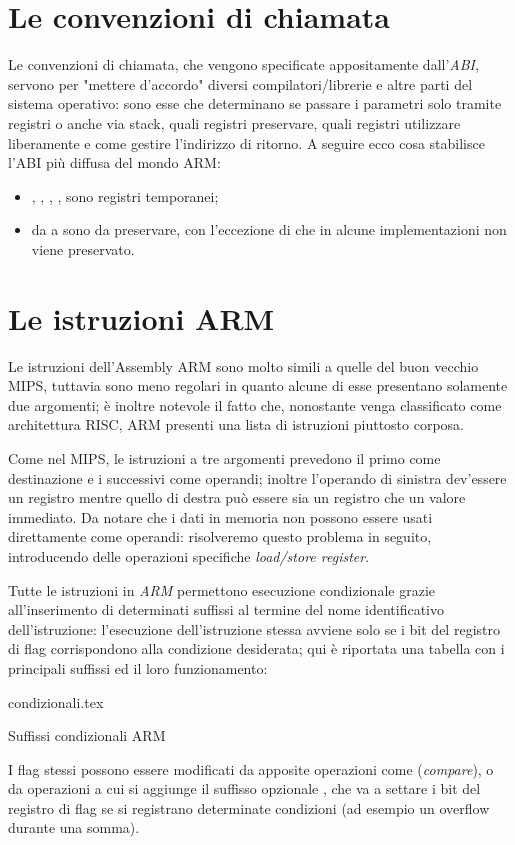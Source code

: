 \documentclass[class=book, crop=false, oneside]{standalone}
\begin{document}
\section{Le convenzioni di chiamata}
Le convenzioni di chiamata, che vengono specificate appositamente dall'\emph{ABI}, servono per "mettere d'accordo" diversi compilatori/librerie e altre parti del sistema operativo: sono esse che determinano se passare i parametri solo tramite registri o anche via stack, quali registri preservare, quali registri utilizzare liberamente e come gestire l'indirizzo di ritorno. A seguire ecco cosa stabilisce l'ABI più diffusa del mondo ARM:
\begin{itemize}
	\item {}, , , ,  sono registri temporanei;
	\item da  a  sono da preservare, con l'eccezione di  che in alcune implementazioni non viene preservato.
\end{itemize}

\section{Le istruzioni ARM}
Le istruzioni dell'Assembly ARM sono molto simili a quelle del buon vecchio MIPS, tuttavia sono meno regolari in quanto alcune di esse presentano solamente due argomenti; è inoltre notevole il fatto che, nonostante venga classificato come architettura RISC, ARM presenti una lista di istruzioni piuttosto corposa.

Come nel MIPS, le istruzioni a tre argomenti prevedono il primo come destinazione e i successivi come operandi; inoltre l'operando di sinistra dev'essere un registro mentre quello di destra può essere sia un registro che un valore immediato. Da notare che i dati in memoria non possono essere usati direttamente come operandi: risolveremo questo problema in seguito, introducendo delle operazioni specifiche \emph{load/store register}.

Tutte le istruzioni in \emph{ARM} permettono esecuzione condizionale grazie all'inserimento di determinati suffissi al termine del nome identificativo dell'istruzione: l'esecuzione dell'istruzione stessa avviene solo se i bit del registro di flag corrispondono alla condizione desiderata; qui è riportata una tabella con i principali suffissi ed il loro funzionamento:

\vspace{0.4cm}
\begin{table}[H]
	\centering
	{condizionali.tex}
	\caption{Suffissi condizionali ARM}
\end{table}
I flag stessi possono essere modificati da apposite operazioni come  (\emph{compare}), o da operazioni a cui si aggiunge il suffisso opzionale , che va a settare i bit del registro di flag se si registrano determinate condizioni (ad esempio un overflow durante una somma).
\end{document}
